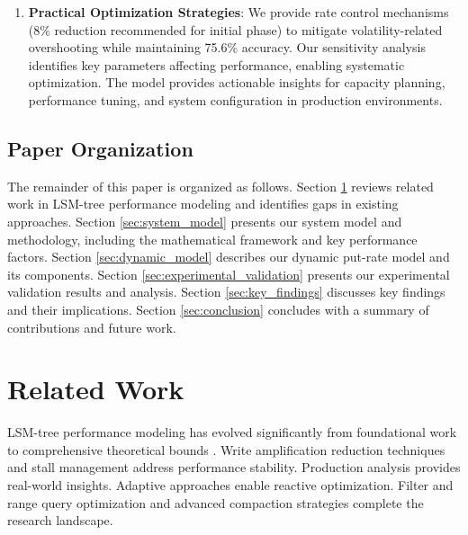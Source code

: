 \documentclass[11pt]{article}
\begin{document}
\begin{enumerate}
    \item \textbf{Practical Optimization Strategies}: We provide rate control mechanisms (8\% reduction recommended for initial phase) to mitigate volatility-related overshooting while maintaining 75.6\% accuracy. Our sensitivity analysis identifies key parameters affecting performance, enabling systematic optimization. The model provides actionable insights for capacity planning, performance tuning, and system configuration in production environments.
\end{enumerate}

\subsection{Paper Organization}

The remainder of this paper is organized as follows. Section \ref{sec:related_work} reviews related work in LSM-tree performance modeling and identifies gaps in existing approaches. Section \ref{sec:system_model} presents our system model and methodology, including the mathematical framework and key performance factors. Section \ref{sec:dynamic_model} describes our dynamic put-rate model and its components. Section \ref{sec:experimental_validation} presents our experimental validation results and analysis. Section \ref{sec:key_findings} discusses key findings and their implications. Section \ref{sec:conclusion} concludes with a summary of contributions and future work.

\section{Related Work}
\label{sec:related_work}

LSM-tree performance modeling has evolved significantly from foundational work \cite{oneil1996lsmtree, sears2012blsm} to comprehensive theoretical bounds \cite{dayan2017lsm, dayan2017monkey, sarkar2021lsmcompaction}. Write amplification reduction techniques \cite{lu2016wisckey, raju2017pebblesdb, chan2018hashkv, li2019hashkv_tos, yao2020matrixkv} and stall management \cite{balmau2017triad, luo2019stability, balmau2019silk} address performance stability. Production analysis \cite{cao2020rocksdbmodel, matsunobu2020myrocks, dong2021rocksdbcacm, huang2019xengine} provides real-world insights. Adaptive approaches \cite{dayan2018dostoevsky, mo2023ruskey, wang2025ecotune, huynh2024klsm} enable reactive optimization. Filter and range query optimization \cite{zhang2018surf, zhong2021remix, vaidya2022snarf, rosetta2020, chen2024oasis} and advanced compaction strategies \cite{ren2017slimdb, dayan2022spooky, sarkar2020lethe, huynh2022endure} complete the research landscape.
\end{document}
